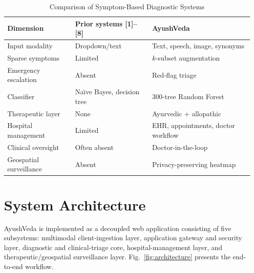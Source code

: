 \documentclass[conference]{IEEEtran}
\begin{document}
\begin{table}[htbp]
\caption{Comparison of Symptom-Based Diagnostic Systems}
\label{tab:comparison}
\centering
\small
\begin{tabularx}{\linewidth}{lXX}
\toprule
\textbf{Dimension} & \textbf{Prior systems [1]--[8]} & \textbf{AyushVeda} \\
\midrule
Input modality & Dropdown/text & Text, speech, image, synonyms \\
Sparse symptoms & Limited & $k$-subset augmentation \\
Emergency escalation & Absent & Red-flag triage \\
Classifier & Na{\"\i}ve Bayes, decision tree & 300-tree Random Forest \\
Therapeutic layer & None & Ayurvedic + allopathic \\
Hospital management & Limited & EHR, appointments, doctor workflow \\
Clinical oversight & Often absent & Doctor-in-the-loop \\
Geospatial surveillance & Absent & Privacy-preserving heatmap \\
\bottomrule
\end{tabularx}
\end{table}

\section{System Architecture}
AyushVeda is implemented as a decoupled web application consisting of five subsystems: multimodal client-ingestion layer, application gateway and security layer, diagnostic and clinical-triage core, hospital-management layer, and therapeutic/geospatial surveillance layer. Fig.~\ref{fig:architecture} presents the end-to-end workflow.
\end{document}
